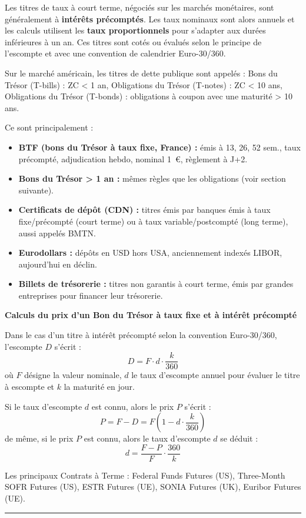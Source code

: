 \begin{f}
Les titres de taux à court terme, négociés sur les marchés monétaires, sont généralement à \textbf{intérêts précomptés}. 
Les taux nominaux sont alors annuels et les calculs utilisent les \textbf{taux proportionnels} pour s'adapter aux durées inférieures à un an.
Ces titres sont cotés ou évalués selon le principe de l'escompte et avec  une convention de calendrier Euro-30/360.

Sur le marché américain, les titres de dette publique sont appelés :
 Bons du Trésor ({T-bills}) : ZC < 1 an,  Obligations du Trésor ({T-notes}) : ZC < 10 ans,
Obligations du Trésor ({T-bonds}) : obligations à coupon avec une maturité > 10 ans.


Ce sont principalement :
\begin{itemize}
  \item \textbf{BTF (bons du Trésor à taux fixe, France) :} émis à 13, 26, 52 sem., taux précompté, adjudication hebdo, nominal 1~€, règlement à J+2.
  
  \item \textbf{Bons du Trésor > 1 an :} mêmes règles que les obligations (voir section suivante).
  
  \item \textbf{Certificats de dépôt (CDN) :} titres émis par banques émis à taux fixe/précompté (court terme) ou à taux variable/postcompté (long terme), aussi appelés BMTN.

  \item \textbf{Eurodollars :} dépôts en USD hors USA, anciennement indexés LIBOR, aujourd’hui en déclin.

  \item \textbf{Billets de trésorerie :} titres non garantis à court terme, émis par grandes entreprises pour financer leur trésorerie.
\end{itemize}

\textbf{Calculs du prix d'un  Bon du Trésor  à taux fixe et à intérêt précompté}

Dans le cas d'un titre à intérêt précompté selon la convention Euro-30/360, l'escompte $D$ s'écrit :
$$
D=F \cdot d \cdot \frac{k}{360}
$$
où $F$ désigne la valeur nominale, $d$ le taux d'escompte annuel pour évaluer le titre à escompte et $k$ la maturité en jour.

Si le taux d'escompte $d$ est connu, alors le prix $P$ s'écrit :
$$
P=F-D=F\left(1-d \cdot \frac{k}{360}\right)
$$
de même, si le prix $P$ est connu, alors le taux d'escompte $d$ se déduit :
$$
d=\frac{F-P}{F} \cdot \frac{360}{k}
$$


Les principaux Contrats à Terme  : Federal Funds Futures (US),
Three-Month SOFR Futures (US),
ESTR Futures (UE),
SONIA Futures (UK),
Euribor Futures (UE).

\end{f}
\hrule



